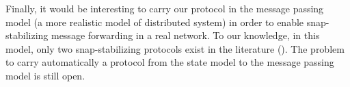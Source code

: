 \documentclass[11pt]{article}
\begin{document}
Finally, it would be interesting to carry our protocol in the message passing model (a more realistic model of distributed system) in order to enable snap-stabilizing message forwarding in a real network. To our knowledge, in this model, only two snap-stabilizing protocols exist in the literature (\cite{DDNT08,DT06}). The problem to carry automatically a protocol from the state model to the message passing model is still open. 



\newpage



\end{document}
